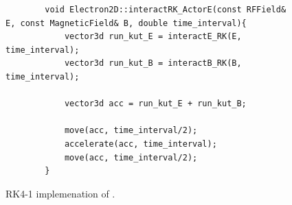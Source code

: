 \documentclass[a4paper,oneside,12pt]{report}
\numberwithin{equation}{chapter}
\begin{document}
\vspace{20pt}
\begin{figure}[H]
    \centering
    \begin{verbatim}
        void Electron2D::interactRK_ActorE(const RFField& E, const MagneticField& B, double time_interval){
            vector3d run_kut_E = interactE_RK(E, time_interval);
            vector3d run_kut_B = interactB_RK(B, time_interval);
        
            vector3d acc = run_kut_E + run_kut_B;
            
            move(acc, time_interval/2);
            accelerate(acc, time_interval);
            move(acc, time_interval/2);
        }
    \end{verbatim}
    \vspace{20pt}
\caption{RK4-1 implemenation of \eEM.}
\label{fig:rk1_EM}
\end{figure}
\end{document}
